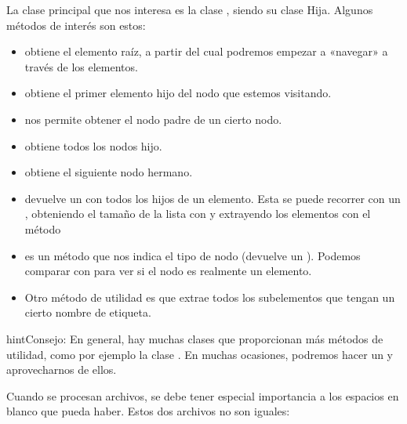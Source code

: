 \documentclass[letterpaper,10pt,spanish]{sphinxmanual}
\begin{document}
La clase principal que nos interesa es la clase , siendo  su clase Hija. Algunos métodos de interés son estos:
\begin{itemize}
\item {} 
 obtiene el elemento raíz, a partir del cual podremos empezar a «navegar» a través de los elementos.

\item {} 
 obtiene el primer elemento hijo del nodo que estemos visitando.

\item {} 
 nos permite obtener el nodo padre de un cierto nodo.

\item {} 
 obtiene todos los nodos hijo.

\item {} 
 obtiene el siguiente nodo hermano.

\item {} 
 devuelve un  con todos los hijos de un elemento. Esta  se puede recorrer con un , obteniendo el tamaño de la lista con  y extrayendo los elementos con el método 

\item {} 
 es un método que nos indica el tipo de nodo (devuelve un ). Podemos comparar con  para ver si el nodo es realmente un elemento.

\item {} 
Otro método de utilidad es  que extrae todos los subelementos que tengan un cierto nombre de etiqueta.

\end{itemize}

\begin{sphinxadmonition}{hint}{Consejo:}
En general, hay muchas clases que proporcionan más métodos de utilidad, como por ejemplo la clase . En muchas ocasiones, podremos hacer un  y aprovecharnos de ellos.
\end{sphinxadmonition}

Cuando se procesan archivos, se debe tener especial importancia a los espacios en blanco que pueda haber. Estos dos archivos no son iguales:
\end{document}
